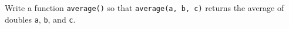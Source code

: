 Write a function \texttt{average()} so that \texttt{average(a, b, c)} returns the average of doubles \texttt{a}, \texttt{b}, and \texttt{c}.

